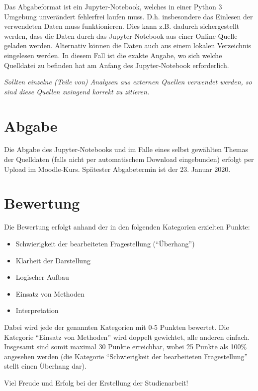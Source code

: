 \documentclass[11pt,a4paper]{article}
\begin{document}
Das Abgabeformat ist ein Jupyter-Notebook, welches in einer Python 3 Umgebung unverändert fehlerfrei laufen muss. D.h. insbesondere das Einlesen der verwendeten Daten muss funktionieren. Dies kann z.B. dadurch sichergestellt werden, dass die Daten durch das Jupyter-Notebook aus einer Online-Quelle geladen werden. Alternativ können die Daten auch aus einem lokalen Verzeichnis eingelesen werden. In diesem Fall ist die exakte Angabe, wo sich welche Quelldatei zu befinden hat  am Anfang des Jupyter-Notebook erforderlich.

\emph{Sollten einzelne (Teile von) Analysen aus externen Quellen verwendet werden, so sind diese Quellen zwingend korrekt zu zitieren.}

\section*{Abgabe}
Die Abgabe des Jupyter-Notebooks und im Falle eines selbst gewählten Themas der Quelldaten (falls nicht per automatischem Download eingebunden) erfolgt per Upload im Moodle-Kurs. Spätester Abgabetermin ist der 23. Januar 2020.

\section*{Bewertung}
Die Bewertung erfolgt anhand der in den folgenden Kategorien erzielten Punkte:
\begin{itemize}
	\item Schwierigkeit der bearbeiteten Fragestellung ("`Überhang"')
	\item Klarheit der Darstellung
	\item Logischer Aufbau
	\item Einsatz von Methoden
	\item Interpretation
\end{itemize}
Dabei wird jede der genannten Kategorien mit 0-5 Punkten bewertet. Die Kategorie "`Einsatz von Methoden"' wird doppelt gewichtet, alle anderen einfach. Insgesamt sind somit maximal 30 Punkte erreichbar, wobei 25 Punkte als 100\% angesehen werden (die Kategorie "`Schwierigkeit der bearbeiteten Fragestellung"' stellt einen Überhang dar).
\vspace{3cm}
\begin{center}
	Viel Freude und Erfolg bei der Erstellung der Studienarbeit!
\end{center}
\end{document}
